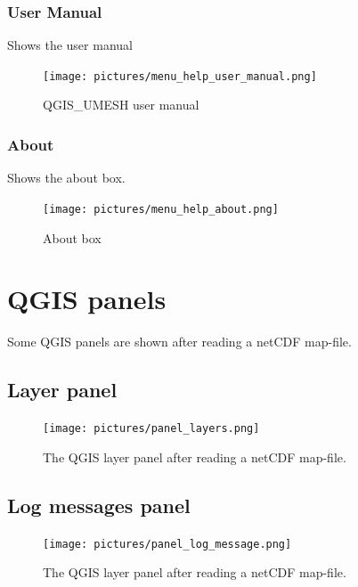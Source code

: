 \documentclass{deltares_memo}
\newcommand{\menuarrow}{$\rightarrow$}
\newcommand{\qumesh}{QGIS\_UMESH\xspace}
\newcommand{\qgis}{QGIS\xspace}
\newcommand{\netcdf}{netCDF\xspace}
\begin{document}
\subsubsection{User Manual}
Shows the user manual
\begin{figure}[H]
	\centering    
	\texttt{[image: pictures/menu\_help\_user\_manual.png]}
	\caption{\qumesh user manual}
\end{figure}

\subsubsection{About}
Shows the about box.
\begin{figure}[H]
    \centering    
    \texttt{[image: pictures/menu\_help\_about.png]}
    \caption{About box}
\end{figure}
\section{QGIS panels}
Some \qgis panels are shown after reading a \netcdf map-file.
\subsection{Layer panel}
\begin{figure}[H]
	\centering    
	\texttt{[image: pictures/panel\_layers.png]}
	\caption{The \qgis layer panel after reading a \netcdf map-file.\label{fig:panel_layer}}
\end{figure}
\subsection{Log messages panel}
\begin{figure}[H]
	\centering    
	\texttt{[image: pictures/panel\_log\_message.png]}
	\caption{The \qgis layer panel after reading a \netcdf map-file.\label{fig:panel_layer}}
\end{figure}
\end{document}
